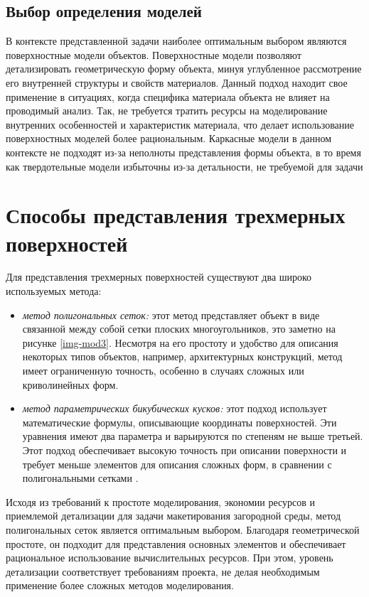 \subsection{Выбор определения моделей} %
В контексте представленной задачи наиболее оптимальным выбором являются поверхностные модели объектов. Поверхностные модели позволяют детализировать геометрическую форму объекта, минуя углубленное рассмотрение его внутренней структуры и свойств материалов. Данный подход находит свое применение в ситуациях, когда специфика материала объекта не влияет на проводимый анализ. Так, не требуется тратить ресурсы на моделирование внутренних особенностей и характеристик материала, что делает использование поверхностных моделей более рациональным. Каркасные модели в данном контексте не подходят из-за неполноты представления формы объекта, в то время как твердотельные модели избыточны из-за детальности, не требуемой для задачи


\section{Способы представления трехмерных поверхностей}

Для представления трехмерных поверхностей существуют два широко используемых метода:

\begin{itemize}
\item \textit{метод полигональных сеток:} этот метод представляет объект в виде связанной между собой сетки плоских многоугольников, это заметно на рисунке  \ref{img-mod3}. Несмотря на его простоту и удобство для описания некоторых типов объектов, например, архитектурных конструкций, метод имеет ограниченную точность, особенно в случаях сложных или криволинейных форм.
\item \textit{метод параметрических бикубических кусков: }этот подход использует математические формулы, описывающие координаты поверхностей. Эти уравнения имеют два параметра и варьируются по степеням не выше третьей. Этот подход обеспечивает высокую точность при описании поверхности и требует меньше элементов для описания сложных форм, в сравнении с полигональными сетками \cite{model_geom}.
\end{itemize}

Исходя из требований к простоте моделирования, экономии ресурсов и приемлемой детализации для задачи макетирования загородной среды, метод полигональных сеток является оптимальным выбором. Благодаря геометрической простоте, он подходит для представления основных элементов и обеспечивает рациональное использование вычислительных ресурсов. При этом, уровень детализации соответствует требованиям проекта, не делая необходимым применение более сложных методов моделирования.

